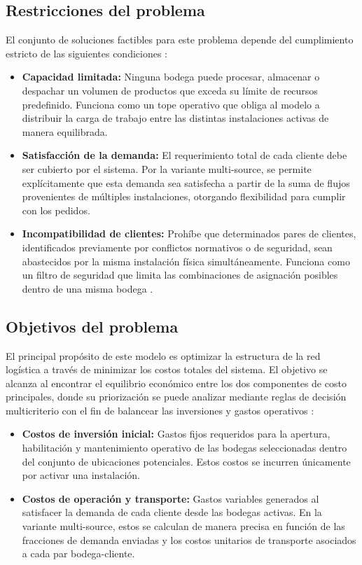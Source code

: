 \documentclass[letter, 10pt]{article}
\begin{document}
\subsection{Restricciones del problema}
El conjunto de soluciones factibles para este problema depende del cumplimiento estricto de las siguientes condiciones \cite{Maia2023}:

\begin{itemize}
    \item \textbf{Capacidad limitada:} Ninguna bodega puede procesar, almacenar o despachar un volumen de productos que exceda su límite de recursos predefinido. Funciona como un tope operativo que obliga al modelo a distribuir la carga de trabajo entre las distintas instalaciones activas de manera equilibrada.
    \item \textbf{Satisfacción de la demanda:} El requerimiento total de cada cliente debe ser cubierto por el sistema. Por la variante multi-source, se permite explícitamente que esta demanda sea satisfecha a partir de la suma de flujos provenientes de múltiples instalaciones, otorgando flexibilidad para cumplir con los pedidos.
    \item \textbf{Incompatibilidad de clientes:} Prohíbe que determinados pares de clientes, identificados previamente por conflictos normativos o de seguridad, sean abastecidos por la misma instalación física simultáneamente. Funciona como un filtro de seguridad que limita las combinaciones de asignación posibles dentro de una misma bodega \cite{ceschia2024, Gjergji2025}.
\end{itemize}

\subsection{Objetivos del problema}
El principal propósito de este modelo es optimizar la estructura de la red logística a través de minimizar los costos totales del sistema. El objetivo se alcanza al encontrar el equilibrio económico entre los dos componentes de costo principales, donde su priorización se puede analizar mediante reglas de decisión multicriterio con el fin de balancear las inversiones y gastos operativos \cite{Maia2023, Herrero2021}:

\begin{itemize}
\item \textbf{Costos de inversión inicial:} Gastos fijos requeridos para la apertura, habilitación y mantenimiento operativo de las bodegas seleccionadas dentro del conjunto de ubicaciones potenciales. Estos costos se incurren únicamente por activar una instalación.
\item \textbf{Costos de operación y transporte:} Gastos variables generados al satisfacer la demanda de cada cliente desde las bodegas activas. En la variante multi-source, estos se calculan de manera precisa en función de las fracciones de demanda enviadas y los costos unitarios de transporte asociados a cada par bodega-cliente.
\end{itemize}
\end{document}
